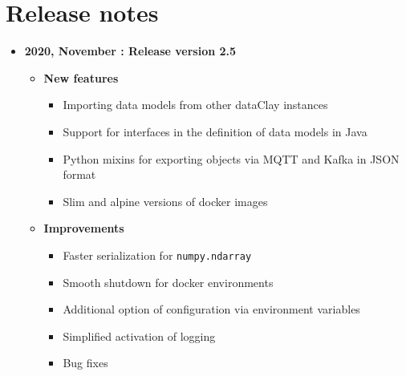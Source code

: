 \chapter*{Release notes}

\begin{itemize}
\item[] \textbf{2020, November : Release version 2.5}\newline
    \begin{itemize}
    \item[] \textbf{New features}
        \begin{itemize}
            \item[] Importing data models from other dataClay instances
            \item[] Support for interfaces in the definition of data models in Java
            \item[] Python mixins for exporting objects via MQTT and Kafka in JSON format
            \item[] Slim and alpine versions of docker images	
        \end{itemize}
    \item[] \textbf{Improvements}
        \begin{itemize}
            \item[] Faster serialization for \texttt{numpy.ndarray} 
            \item[] Smooth shutdown for docker environments
            \item[] Additional option of configuration via environment variables
            \item[] Simplified activation of logging
            \item[] Bug fixes
        \end{itemize}
    \end{itemize}
\end{itemize}
